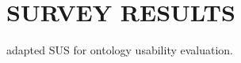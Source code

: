 \chapter{SURVEY RESULTS}
\label{survey-results}
\cite{casellas2009ontology} adapted SUS for ontology usability evaluation.
